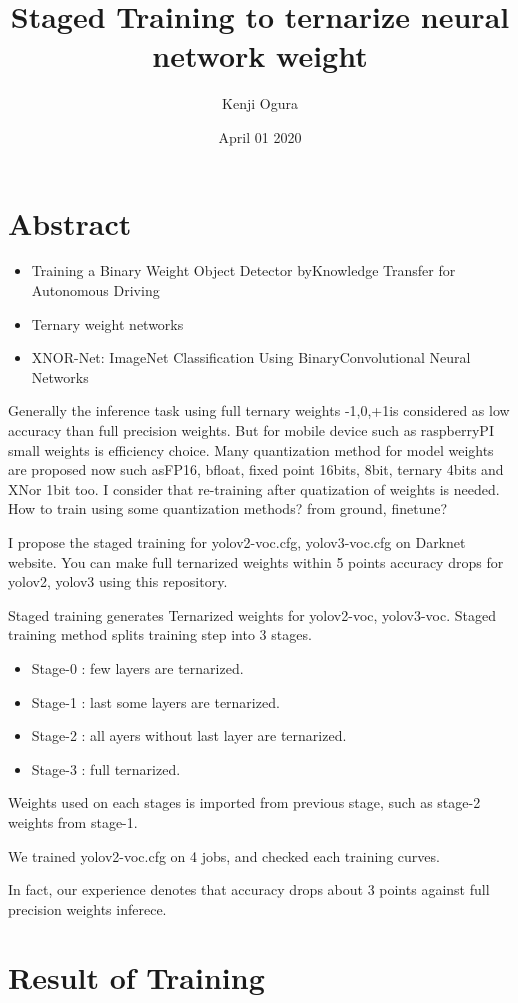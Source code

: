 \documentclass[twocolumn]{article}
\begin{document}
\title{Staged Training to ternarize neural network weight}
\author{Kenji Ogura}
\date{April 01 2020}
\maketitle

\section{Abstract}

\begin{itemize}
\item
Training a Binary Weight Object Detector byKnowledge Transfer for Autonomous Driving
\item
Ternary weight networks
\item
XNOR-Net: ImageNet Classification Using BinaryConvolutional Neural Networks
\end{itemize}

Generally the inference task using full ternary weights -1,0,+1is considered as low accuracy than full precision weights.
But for mobile device such as raspberryPI small weights is efficiency choice.
Many quantization method for model weights are proposed now such asFP16, bfloat, fixed point 16bits, 8bit, ternary 4bits and XNor 1bit too.
I consider that re-training after quatization of weights is needed.
How to train using some quantization methods? from ground, finetune?

I propose the staged training for yolov2-voc.cfg, yolov3-voc.cfg on Darknet website.
You can make full ternarized weights within 5 points accuracy drops
for yolov2, yolov3 using this repository.

Staged training generates Ternarized weights for yolov2-voc, yolov3-voc.
Staged training method splits training step into 3 stages.

\begin{itemize}
\item Stage-0 : few layers are ternarized.
\item Stage-1 : last some layers are ternarized.
\item Stage-2 : all ayers without last layer are ternarized.
\item Stage-3 : full ternarized.
\end{itemize}

Weights used on each stages is imported from previous stage, such as stage-2 weights from stage-1.

We trained yolov2-voc.cfg on 4 jobs, and checked each training curves.

In fact, our experience denotes that accuracy drops about 3 points against full precision weights inferece.

\section{Result of Training}
\end{document}

